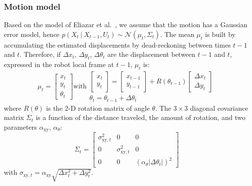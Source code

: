 \documentclass[letterpaper, 10pt, conference]{ieeeconf}
\begin{document}
\subsubsection{Motion model}

Based on the model of Eliazar et al.~\cite{eliazar2004motionmodel}, we assume that the motion has a Gaussian error model, hence $p(X_t~|~X_{t-1}, U_{t})\sim\mathcal{N}(\mu_t,\Sigma_t)$.
The mean $\mu_t$ is built by accumulating the estimated displacements by dead-reckoning between times $t-1$ and $t$.
Therefore, if $\Delta x_t$, $\Delta y_t$, $\Delta \theta_t$ are the displacement between $t-1$ and $t$, expressed in the robot local frame at $t-1$, $\mu_t$ is:
\begin{equation*}
\mu_t =
\left[ \begin{array}{c} x_t \\ y_t \\ \theta_t \end{array} \right]
\text{with}
\begin{array}{c}
\left[ \begin{array}{c} x_t \\ y_t \end{array} \right] =
\left[ \begin{array}{c} x_{t-1} \\ y_{t-1} \end{array} \right] +
R(\theta_{t-1})
\left[ \begin{array}{c} \Delta x_{t} \\ \Delta y_{t} \end{array} \right]
\\
\theta_t = \theta_{t-1} + \Delta \theta_t
\end{array}
\end{equation*}
where $R(\theta)$ is the 2-D rotation matrix of angle $\theta$.
The $3\times3$ diagonal covariance matrix $\Sigma_t$ is a function of the distance traveled, the amount of rotation, and two parameters $\alpha_\mathrm{xy}$, $\alpha_\theta$:
\begin{equation*}
\Sigma_t=\begin{bmatrix} \sigma_{\mathrm{xy},t}^2 & 0 & 0 \\ 0 & \sigma_{\mathrm{xy},t}^2 & 0 \\ 0 & 0 & (\alpha_\theta | \Delta \theta_t |)^2 \end{bmatrix}
\end{equation*}
with $ \sigma_{\mathrm{xy},t} = \alpha_\mathrm{xy} \sqrt{\Delta x_{t}^2 + \Delta y_{t}^2}$.
\end{document}
